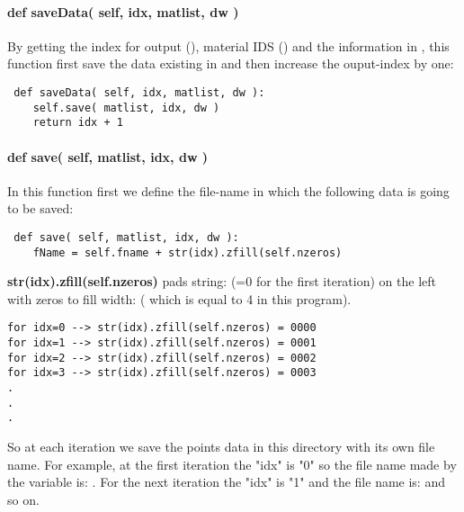 \documentclass[11pt,fleqn]{book} %
\begin{document}
\paragraph{def saveData( self, idx, matlist, dw )}
By getting the index for output (), material IDS () and the information in , this function first save the data existing in  and then increase the ouput-index by one:
\begin{lstlisting}
 def saveData( self, idx, matlist, dw ):
	self.save( matlist, idx, dw )
	return idx + 1
\end{lstlisting}
\paragraph{def save( self, matlist, idx, dw )}
In this function first we define the file-name in which the following data is going to be saved:
\begin{lstlisting}
 def save( self, matlist, idx, dw ):	
	fName = self.fname + str(idx).zfill(self.nzeros)
\end{lstlisting}

\textbf{str(idx).zfill(self.nzeros)} pads string: (=0 for the first iteration) on the left with zeros to fill width: ( which is equal to 4 in this program). 
\begin{lstlisting}
for idx=0 --> str(idx).zfill(self.nzeros) = 0000
for idx=1 --> str(idx).zfill(self.nzeros) = 0001
for idx=2 --> str(idx).zfill(self.nzeros) = 0002
for idx=3 --> str(idx).zfill(self.nzeros) = 0003
.
.
.
\end{lstlisting}
So at each iteration we save the points data in this directory with its own file name. For example, at the first iteration the "idx" is "0" so the file name made by the  variable is: . For the next iteration the "idx" is "1" and the file name is:  and so on.
\end{document}
